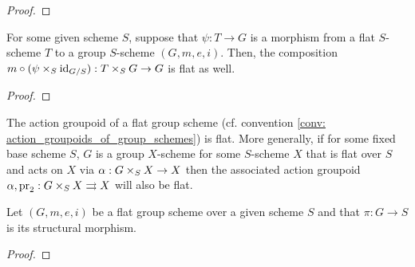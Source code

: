             \begin{proof}
                
            \end{proof}
        \begin{lemma} \label{lemma: flatness_criterion_for_action_groupoids_of_group_schemes}
            For some given scheme $S$, suppose that $\psi: T \to G$ is a morphism from a flat $S$-scheme $T$ to a group $S$-scheme $(G, m, e, i)$. Then, the composition $m \circ (\psi \x_S \id_{G/S}): T \x_S G \to G$ is flat as well.
        \end{lemma}
            \begin{proof}
                
            \end{proof}
        \begin{corollary}
            The action groupoid of a flat group scheme (cf. convention \ref{conv: action_groupoids_of_group_schemes}) is flat. More generally, if for some fixed base scheme $S$, $G$ is a group $X$-scheme for some $S$-scheme $X$ that is flat over $S$ and acts on $X$ via $\alpha: G \x_S X \to X$ then the associated action groupoid $\alpha, \pr_2: G \x_S X \toto X$ will also be flat.
        \end{corollary}
        \begin{proposition} \label{prop: differential_forms_on_group_schemes}
            Let $(G, m, e, i)$ be a flat group scheme over a given scheme $S$ and that $\pi: G \to S$ is its structural morphism. 
        \end{proposition}
            \begin{proof}
                
            \end{proof}

